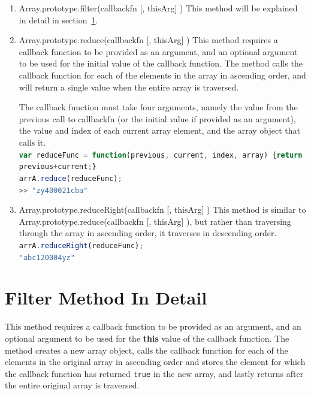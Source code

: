 \documentclass[a4paper,11pt,twoside]{report}
\def\jsinline{\lstinline[language=JavaScript, basicstyle=\small]}%\end{lstlisting}
\begin{document}
\begin{enumerate}
\item Array.prototype.filter(callbackfn [, thisArg] ) \newline
This method will be explained in detail in section~\ref{sec:filter}.

\item Array.prototype.reduce(callbackfn [, thisArg] ) \newline
This method requires a callback function to be provided as an argument, and an optional argument to be used for the initial value of the callback function. The method calls the callback function for each of the elements in the array in ascending order, and will return a single value when the entire array is traversed.

The callback function must take four arguments, namely the value from the previous call to callbackfn (or the initial value if provided as an argument), the value and index of each current array element, and the array object that calls it. \\
\jsinline|var reduceFunc = function(previous, current, index, array) {return previous+current;}|\\
\jsinline|arrA.reduce(reduceFunc);|\\
\jsinline|>> "zy400021cba"|

\item Array.prototype.reduceRight(callbackfn [, thisArg] ) \newline
This method is similar to Array.prototype.reduce(callbackfn [, thisArg] ), but rather than traversing through the array in ascending order, it traverses in descending order.\\
\jsinline|arrA.reduceRight(reduceFunc);|\\
\jsinline|"abc120004yz"|
\end{enumerate}

\section{Filter Method In Detail}\label{sec:filter}
This method requires a callback function to be provided as an argument, and an optional argument to be used for the \textbf{this} value of the callback function. The method creates a new array object, calls the callback function for each of the elements in the original array in ascending order and stores the element for which the callback function has returned \texttt{true} in the new array, and lastly returns after the entire original array is traversed. 
\end{document}
